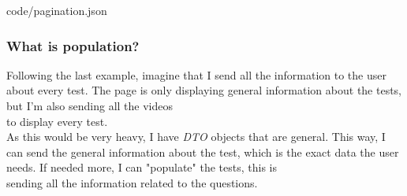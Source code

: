         
        {code/pagination.json}
        
        \subsubsection{What is population?}
        Following the last example, imagine that I send all the information to the user about every test. The page is only displaying general information about the tests, but I'm also sending all the videos \\
        to display every test. \\
        
        As this would be very heavy, I have \textit{DTO} objects that are general. This way, I can send the general information about the test, which is the exact data the user needs. If needed more, I can "populate" the tests, this is \\
        sending all the information related to the questions.

